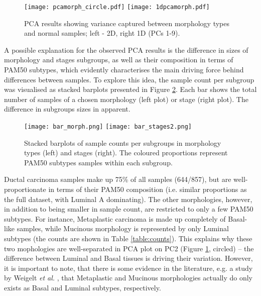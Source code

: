             \begin{figure}[!h]
            \hspace*{\fill}
            \texttt{[image: pcamorph\_circle.pdf]}\hfill
            \texttt{[image: 1dpcamorph.pdf]}
            \hspace*{\fill}
            \caption[PCA plots (2D and 1D) showing separation by tumour morphologies]{PCA results showing variance captured between morphology types and normal samples; left - 2D, right 1D (PCs 1-9). }
            \label{fig:1dpcamorph}
            \end{figure}

    
    \newpage
    A possible explanation for the observed PCA results is the difference in sizes of morphology and stages subgroups, as well as their composition in terms of PAM50 subtypes, which evidently characterises the main driving force behind differences between samples. To explore this idea, the sample count per subgroup was visualised as stacked barplots presented in Figure \ref{fig:barms}. Each bar shows the total number of samples of a chosen morphology (left plot) or stage (right plot). The difference in subgroups sizes in apparent.
       
        \begin{figure}[!h]
        \texttt{[image: bar\_morph.png]}\hfill
        \texttt{[image: bar\_stages2.png]}
        \caption[Stacked barplots of samples count per stage and morphology type]{Stacked barplots of sample counts per subgroups in morphology types (left) and stages (right). The coloured proportions represent PAM50 subtypes samples within each subgroup.}
        \label{fig:barms}
        \end{figure}
        
    Ductal carcinoma samples make up 75\% of all samples (644/857), but are well-proportionate in terms of their PAM50 composition (i.e. similar proportions as the full dataset, with Luminal A dominating). The other morphologies, however, in addition to being smaller in sample count, are restricted to only a few PAM50 subtypes. For instance, Metaplastic carcinoma is made up completely of Basal-like samples, while Mucinous morphology is represented by only Luminal subtypes (the counts are shown in Table \ref{table:counts}). This explains why these two mophologies are well-separated in PCA plot on PC2 (Figure \ref{fig:1dpcamorph}, circled) -- the difference between Luminal and Basal tissues is driving their variation. However, it is important to note, that there is some evidence in the literature, e.g. a study by Weigelt \textit{et al.} \cite{Weigelt2010a}, that Metaplastic and Mucinous morphologies actually do only exists as Basal and Luminal subtypes, respectively.  
    
